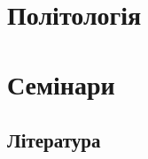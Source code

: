 \documentclass[a5paper,12pt,ukrainian]{book}
\begin{document}
\chapter{Політологія}







\chapter{Семінари}





\section{Література}
\end{document}
